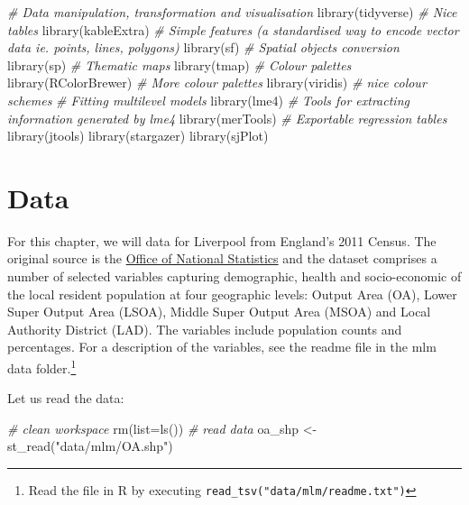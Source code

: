 \documentclass[
]{book}
\newenvironment{Shaded}{\begin{snugshade}}{\end{snugshade}}
\newcommand{\AttributeTok}[1]{\textcolor[rgb]{0.77,0.63,0.00}{#1}}
\newcommand{\CommentTok}[1]{\textcolor[rgb]{0.56,0.35,0.01}{\textit{#1}}}
\newcommand{\FunctionTok}[1]{\textcolor[rgb]{0.00,0.00,0.00}{#1}}
\newcommand{\NormalTok}[1]{#1}
\newcommand{\OtherTok}[1]{\textcolor[rgb]{0.56,0.35,0.01}{#1}}
\newcommand{\StringTok}[1]{\textcolor[rgb]{0.31,0.60,0.02}{#1}}
\begin{document}
\begin{Shaded}
\begin{Highlighting}[]
\CommentTok{\# Data manipulation, transformation and visualisation}
\FunctionTok{library}\NormalTok{(tidyverse)}
\CommentTok{\# Nice tables}
\FunctionTok{library}\NormalTok{(kableExtra)}
\CommentTok{\# Simple features (a standardised way to encode vector data ie. points, lines, polygons)}
\FunctionTok{library}\NormalTok{(sf) }
\CommentTok{\# Spatial objects conversion}
\FunctionTok{library}\NormalTok{(sp) }
\CommentTok{\# Thematic maps}
\FunctionTok{library}\NormalTok{(tmap) }
\CommentTok{\# Colour palettes}
\FunctionTok{library}\NormalTok{(RColorBrewer) }
\CommentTok{\# More colour palettes}
\FunctionTok{library}\NormalTok{(viridis) }\CommentTok{\# nice colour schemes}
\CommentTok{\# Fitting multilevel models}
\FunctionTok{library}\NormalTok{(lme4)}
\CommentTok{\# Tools for extracting information generated by lme4}
\FunctionTok{library}\NormalTok{(merTools)}
\CommentTok{\# Exportable regression tables}
\FunctionTok{library}\NormalTok{(jtools)}
\FunctionTok{library}\NormalTok{(stargazer)}
\FunctionTok{library}\NormalTok{(sjPlot)}
\end{Highlighting}
\end{Shaded}

\hypertarget{data-4}{%
\section{Data}\label{data-4}}

For this chapter, we will data for Liverpool from England's 2011 Census. The original source is the \href{https://www.nomisweb.co.uk/home/census2001.asp}{Office of National Statistics} and the dataset comprises a number of selected variables capturing demographic, health and socio-economic of the local resident population at four geographic levels: Output Area (OA), Lower Super Output Area (LSOA), Middle Super Output Area (MSOA) and Local Authority District (LAD). The variables include population counts and percentages. For a description of the variables, see the readme file in the mlm data folder.\footnote{Read the file in R by executing \texttt{read\_tsv("data/mlm/readme.txt")}}

Let us read the data:

\begin{Shaded}
\begin{Highlighting}[]
\CommentTok{\# clean workspace}
\FunctionTok{rm}\NormalTok{(}\AttributeTok{list=}\FunctionTok{ls}\NormalTok{())}
\CommentTok{\# read data}
\NormalTok{oa\_shp }\OtherTok{\textless{}{-}} \FunctionTok{st\_read}\NormalTok{(}\StringTok{"data/mlm/OA.shp"}\NormalTok{)}
\end{Highlighting}
\end{Shaded}
\end{document}
